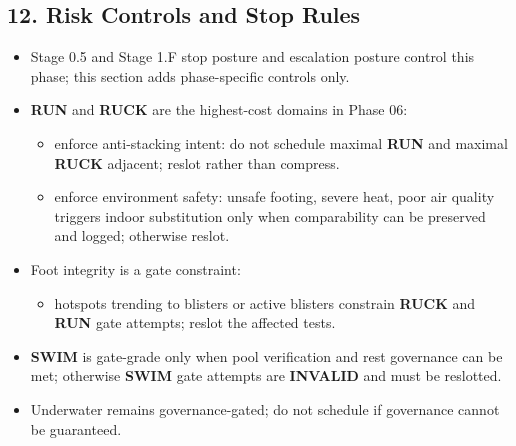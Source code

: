 \documentclass[10pt]{article}
\begin{document}
\subsection*{12. Risk Controls and Stop Rules}

\begin{itemize}
\item Stage 0.5 and Stage 1.F stop posture and escalation posture control this phase; this section adds phase-specific controls only.
\item \textbf{RUN} and \textbf{RUCK} are the highest-cost domains in Phase 06:
  \begin{itemize}
  \item enforce anti-stacking intent: do not schedule maximal \textbf{RUN} and maximal \textbf{RUCK} adjacent; reslot rather than compress.
  \item enforce environment safety: unsafe footing, severe heat, poor air quality triggers indoor substitution only when comparability can be preserved and logged; otherwise reslot.
  \end{itemize}
\item Foot integrity is a gate constraint:
  \begin{itemize}
  \item hotspots trending to blisters or active blisters constrain \textbf{RUCK} and \textbf{RUN} gate attempts; reslot the affected tests.
  \end{itemize}
\item \textbf{SWIM} is gate-grade only when pool verification and rest governance can be met; otherwise \textbf{SWIM} gate attempts are \textbf{INVALID} and must be reslotted.
\item Underwater remains governance-gated; do not schedule if governance cannot be guaranteed.
\end{itemize}
\end{document}
